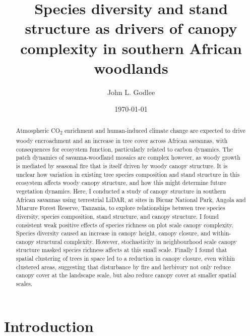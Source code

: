 \documentclass[11pt,a4paper]{article}
\title{Species diversity and stand structure as drivers of canopy complexity in southern African woodlands}
\author{John L. Godlee}
\date{\today}
\begin{document}
\maketitle{}

\linenumbers

\begin{abstract}
Atmospheric CO\textsubscript{2} enrichment and human-induced climate change are expected to drive woody encroachment and an increase in tree cover across African savannas, with consequences for ecosystem function, particularly related to carbon dynamics. The patch dynamics of savanna-woodland mosaics are complex however, as woody growth is mediated by seasonal fire that is itself driven by woody canopy structure. It is unclear how variation in existing tree species composition and stand structure in this ecosystem affects woody canopy structure, and how this might determine future vegetation dynamics. Here, I conducted a study of canopy structure in southern African savannas using terrestrial LiDAR, at sites in Bicuar National Park, Angola and Mtarure Forest Reserve, Tanzania, to explore relationships between tree species diversity, species composition, stand structure, and canopy structure. I found consistent weak positive effects of species richness on plot scale canopy complexity. Species diversity caused an increase in canopy height, canopy closure, and within-canopy structural complexity. However, stochasticity in neighbourhood scale canopy structure masked species richness affects at this small scale. Finally I found that spatial clustering of trees in space led to a reduction in canopy closure, even within clustered areas, suggesting that disturbance by fire and herbivory not only reduce canopy cover at the landscape scale, but also reduce canopy cover at smaller spatial scales.
\end{abstract}

\section{Introduction}
\end{document}
